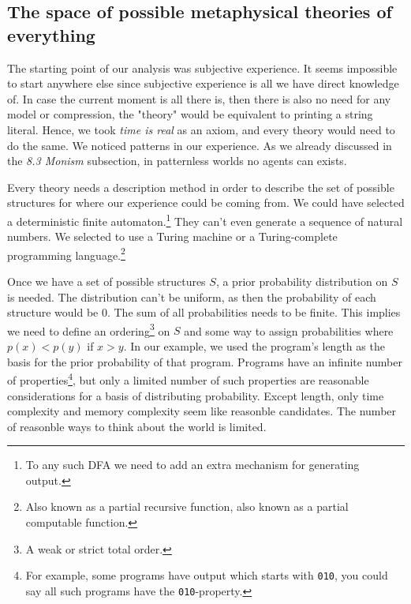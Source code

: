 \documentclass[oneside,hidelinks]{article}
\begin{document}
\newpage

\subsection{The space of possible metaphysical theories of everything}

The starting point of our analysis was subjective experience.
It seems impossible to start anywhere else since subjective experience is all we have direct knowledge of.
In case the current moment is all there is, then there is also no need for any model or compression, the "theory" would be equivalent to printing a string literal.
Hence, we took \textit{time is real} as an axiom, and every theory would need to do the same.
We noticed patterns in our experience. As we already discussed in the \textit{8.3 Monism} subsection, in patternless worlds no agents can exists.

Every theory needs a description method in order to describe the set of possible structures for where our experience could be coming from.
We could have selected a deterministic finite automaton.\footnote{To any such DFA we need to add an extra mechanism for generating output.}
They can't even generate a sequence of natural numbers.
We selected to use a Turing machine or a Turing-complete programming language.\footnote{Also known as a partial recursive function, also known as a partial computable function.}

Once we have a set of possible structures $S$, a prior probability distribution on $S$ is needed.
The distribution can't be uniform, as then the probability of each structure would be 0.
The sum of all probabilities needs to be finite.
This implies we need to define an ordering\footnote{A weak or strict total order.} on $S$ and some way to assign probabilities where $p(x) < p(y)$ if $x > y$.
In our example, we used the program's length as the basis for the prior probability of that program.
Programs have an infinite number of properties\footnote{For example, some programs have output which starts with \texttt{010}, you could say all such programs have the \texttt{010}-property.}, but only a limited number of such properties are reasonable considerations for a basis of distributing probability.
Except length, only time complexity and memory complexity seem like reasonble candidates.
The number of reasonble ways to think about the world is limited.

\newpage
\end{document}
